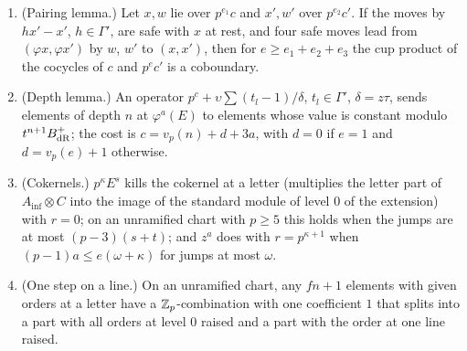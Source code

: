 \begin{proposition}\label{prop:pairing-lemma}
\begin{enumerate}[label=\textup{(\alph*)}]
\item (Pairing lemma.) Let $x,w$ lie over $p^{e_1}c$ and $x',w'$ over $p^{e_2}c'$. If the moves by $hx'-x'$, $h\in\Gamma'$, are safe with $x$ at rest, and four safe moves lead from $(\varphi x,\varphi x')$ by $w$, $w'$ to $(x,x')$, then for
$e\ge e_1+e_2+e_3$ the cup product of the cocycles of $c$ and $p^ec'$ is a coboundary.
\item (Depth lemma.) An operator $p^c+\upsilon\sum(t_l-1)/\delta$, $t_l\in\Gamma'$, $\delta=z\tau$, sends elements of depth $n$ at $\varphi^a(E)$ to elements whose value is constant modulo $t^{n+1}B_{\rm dR}^+$; the cost is
$c=v_p(n)+d+3a$, with $d=0$ if $e=1$ and $d=v_p(e)+1$ otherwise.
\item (Cokernels.) $p^\kappa E^s$ kills the cokernel at a letter (multiplies the letter part of $A_{\inf}\otimes C$ into the image of the standard module of level $0$ of the extension) with $r=0$; on an unramified chart with
$p\ge5$ this holds when the jumps are at most $(p-3)(s+t)$; and $z^a$ does with $r=p^{\kappa+1}$ when $(p-1)a\le e(\omega+\kappa)$ for jumps at most $\omega$.
\item (One step on a line.) On an unramified chart, any $fn+1$ elements with given orders at a letter have a $\mathbb{Z}_p$-combination with one coefficient $1$ that splits into a part with all orders at level $0$ raised and a part with the
order at one line raised.
\end{enumerate}
\end{proposition}

